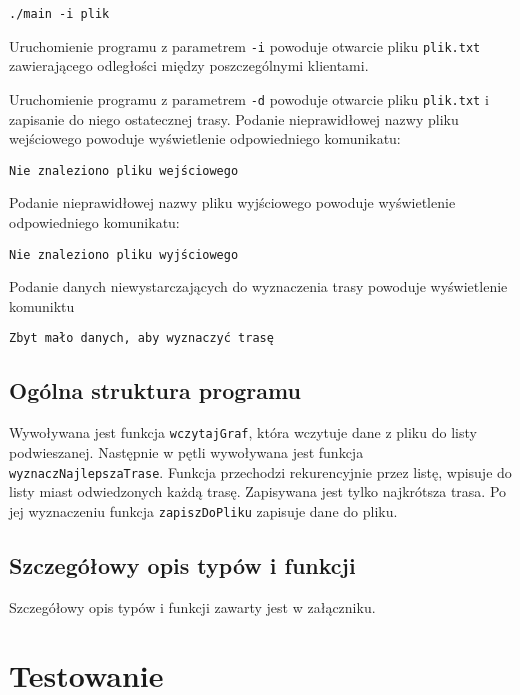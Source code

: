 \documentclass[12pt,a4paper,twoside]{article}
\let\oldmarginpar\marginpar
\renewcommand\marginpar[1]{%
  {\linespread{0.85}\normalfont\scriptsize%
\oldmarginpar[\hspace{1cm}\begin{minipage}{3cm}\raggedleft\scriptsize\color{black}\textsf{#1}\end{minipage}]%
{\hspace{0cm}\begin{minipage}{3cm}\raggedright\scriptsize\color{black}\textsf{#1}\end{minipage}}%
}%
}
\begin{document}
\begin{verbatim}
./main -i plik
\end{verbatim}
Uruchomienie programu z parametrem \texttt{-i} powoduje otwarcie pliku \texttt{plik.txt}  zawierającego odległości między poszczególnymi klientami. 






Uruchomienie programu z parametrem \texttt{-d} powoduje otwarcie pliku \texttt{plik.txt}  i zapisanie do niego ostatecznej trasy. 
Podanie nieprawidłowej nazwy pliku wejściowego powoduje wyświetlenie odpowiedniego komunikatu:
\begin{verbatim}
Nie znaleziono pliku wejściowego
\end{verbatim}
Podanie nieprawidłowej nazwy pliku wyjściowego powoduje wyświetlenie odpowiedniego komunikatu:
\begin{verbatim}
Nie znaleziono pliku wyjściowego
\end{verbatim}

Podanie danych niewystarczających do wyznaczenia trasy powoduje wyświetlenie komuniktu
\begin{verbatim}
Zbyt mało danych, aby wyznaczyć trasę
\end{verbatim}




\subsection{Ogólna struktura programu}
\marginpar{}
Wywoływana jest funkcja \lstinline|wczytajGraf|, która wczytuje dane z pliku do listy podwieszanej. 
Następnie w pętli wywoływana jest funkcja \lstinline|wyznaczNajlepszaTrase|. 
Funkcja przechodzi rekurencyjnie przez listę, wpisuje do listy miast odwiedzonych każdą trasę. 
Zapisywana jest tylko najkrótsza trasa. Po jej wyznaczeniu funkcja \lstinline|zapiszDoPliku| zapisuje dane do pliku.



\subsection{Szczegółowy opis typów i funkcji}

Szczegółowy opis typów i funkcji zawarty jest w załączniku. 

\section{Testowanie}
\marginpar{}
\end{document}
